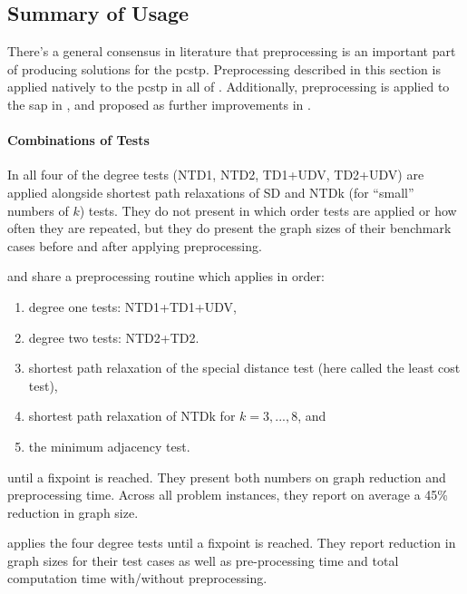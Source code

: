  \subsection{Summary of Usage}\label{sec:pre:summary-usage}
There's a general consensus in literature that preprocessing is an important part of producing solutions
for the \gls{pcstp}. Preprocessing described in this section is applied natively to the \gls{pcstp}
in all of
\cite{lucena2004strong, Ljubic:2004:memetic, ljubic2005solving,akhmedov2016divide,gamrath2017scip}.
Additionally, preprocessing is applied to the \gls{sap} in \cite{leitner2016dual}, and proposed
as further improvements in \cite{fu2014knowledge}.

\paragraph{Combinations of Tests}

In \cite{lucena2004strong} all four of the degree tests (NTD1, NTD2, TD1+UDV, TD2+UDV) are
applied alongside shortest path relaxations of SD and NTDk (for ``small'' numbers of $k$)
tests. They do not
present in which order tests are applied or how often they are repeated, but they
do present the graph sizes of their benchmark cases before and after applying preprocessing.

\cite{Ljubic:2004:memetic} and \cite{ljubic2005solving} share a preprocessing routine
 which applies in order:
\begin{enumerate}
\item degree one tests: NTD1+TD1+UDV,
\item degree two tests: NTD2+TD2.
\item shortest path relaxation of the special distance test (here called the least cost test),
\item shortest path relaxation of NTDk for $k = 3,...,8$, and
\item the minimum adjacency test.
\end{enumerate}
until a fixpoint is reached. They present both numbers on graph reduction and preprocessing
time. Across all problem instances, they report on average
a 45\% reduction in graph size.

\cite{akhmedov2016divide} applies the four degree tests until a fixpoint is reached. They
report reduction in graph sizes for their test cases as well as pre-processing time and
total computation time with/without preprocessing.


